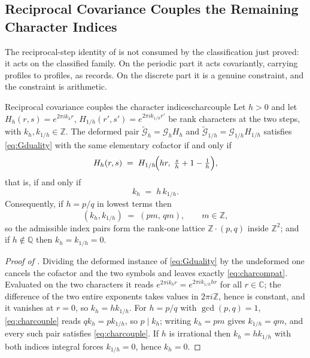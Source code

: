 \documentclass[11pt,letterpaper]{article}
\newcommand{\Gc}{\mathcal{G}}               %
\newcommand{\Zint}{\mathbb{Z}}
\newcommand{\Cc}{\mathbb{C}}
\newcommand{\Qq}{\mathbb{Q}}
\begin{document}
\subsection{Reciprocal Covariance Couples the Remaining Character Indices}
\label{sec:charcouple}

The reciprocal-step identity of  is not consumed by the
classification just proved: it acts on the classified family. On the periodic
part it acts covariantly, carrying profiles to profiles, as
 records. On the discrete part it is a genuine
constraint, and the constraint is arithmetic.

\begin{proposition}{Reciprocal covariance couples the character indices}{charcouple}
Let $h>0$ and let $H_h(r,s)=e^{2\pi ik_hr}$, $H_{1/h}(r',s')=e^{2\pi ik_{1/h}r'}$
be rank characters at the two steps, with $k_h,k_{1/h}\in\Zint$. The deformed
pair $\widetilde{\Gc}_h=\Gc_hH_h$ and $\widetilde{\Gc}_{1/h}=\Gc_{1/h}H_{1/h}$
satisfies \eqref{eq:Gduality} with the same elementary cofactor if and only if
\begin{equation}
  H_h(r,s)\;=\;H_{1/h}\!\Bigl(hr,\;\tfrac{s}{h}+1-\tfrac1h\Bigr),
  \label{eq:charcompat}
\end{equation}
that is, if and only if
\begin{equation}
  k_h\;=\;h\,k_{1/h}.
  \label{eq:charcouple}
\end{equation}
Consequently, if $h=p/q$ in lowest terms then
\begin{equation}
  (k_h,k_{1/h})\;=\;(pm,\,qm),\qquad m\in\Zint,
  \label{eq:charlattice}
\end{equation}
so the admissible index pairs form the rank-one lattice $\Zint\cdot(p,q)$ inside
$\Zint^{2}$; and if $h\notin\Qq$ then $k_h=k_{1/h}=0$.
\end{proposition}

\begin{proof}[Proof of ]
Dividing the deformed instance of \eqref{eq:Gduality} by the undeformed one
cancels the cofactor and the two symbols and leaves exactly
\eqref{eq:charcompat}. Evaluated on the two characters it reads
$e^{2\pi ik_hr}=e^{2\pi ik_{1/h}hr}$ for all $r\in\Cc$; the difference of the
two entire exponents takes values in $2\pi i\Zint$, hence is constant, and it
vanishes at $r=0$, so $k_h=hk_{1/h}$. For $h=p/q$ with $\gcd(p,q)=1$,
\eqref{eq:charcouple} reads $qk_h=pk_{1/h}$, so $p\mid k_h$; writing $k_h=pm$
gives $k_{1/h}=qm$, and every such pair satisfies \eqref{eq:charcouple}. If $h$
is irrational then $k_h=hk_{1/h}$ with both indices integral forces
$k_{1/h}=0$, hence $k_h=0$.
\end{proof}
\end{document}

